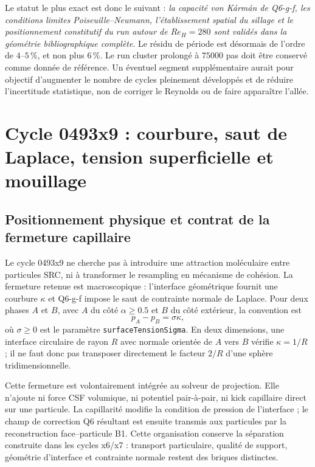 \documentclass[11pt,a4paper]{article}
\begin{document}
Le statut le plus exact est donc le suivant : \emph{la capacité von Kármán de Q6-g-f, les conditions limites Poiseuille--Neumann, l'établissement spatial du sillage et le positionnement constitutif du run autour de $Re_H=280$ sont validés dans la géométrie bibliographique complète}. Le résidu de période est désormais de l'ordre de $4$--$5\,\%$, et non plus $6\,\%$. Le run cluster prolongé à $75000$ pas doit être conservé comme donnée de référence. Un éventuel segment supplémentaire aurait pour objectif d'augmenter le nombre de cycles pleinement développés et de réduire l'incertitude statistique, non de corriger le Reynolds ou de faire apparaître l'allée.


\section{Cycle 0493x9 : courbure, saut de Laplace, tension superficielle et mouillage}
\label{sec:x9_surface_tension}

\subsection{Positionnement physique et contrat de la fermeture capillaire}

Le cycle 0493x9 ne cherche pas à introduire une attraction moléculaire entre particules SRC, ni à transformer le resampling en mécanisme de cohésion. La fermeture retenue est macroscopique : l'interface géométrique fournit une courbure $\kappa$ et Q6-g-f impose le saut de contrainte normale de Laplace. Pour deux phases $A$ et $B$, avec $A$ du côté $\alpha\geq 0.5$ et $B$ du côté extérieur, la convention est
\begin{equation}
  p_A-p_B=\sigma\kappa,
  \label{eq:x9_laplace_jump}
\end{equation}
où $\sigma\geq0$ est le paramètre \texttt{surfaceTensionSigma}. En deux dimensions, une interface circulaire de rayon $R$ avec normale orientée de $A$ vers $B$ vérifie $\kappa=1/R$ ; il ne faut donc pas transposer directement le facteur $2/R$ d'une sphère tridimensionnelle.

Cette fermeture est volontairement intégrée au solveur de projection. Elle n'ajoute ni force CSF volumique, ni potentiel pair-à-pair, ni kick capillaire direct sur une particule. La capillarité modifie la condition de pression de l'interface ; le champ de correction Q6 résultant est ensuite transmis aux particules par la reconstruction face--particule B1. Cette organisation conserve la séparation construite dans les cycles x6/x7 : transport particulaire, qualité de support, géométrie d'interface et contrainte normale restent des briques distinctes.
\end{document}
